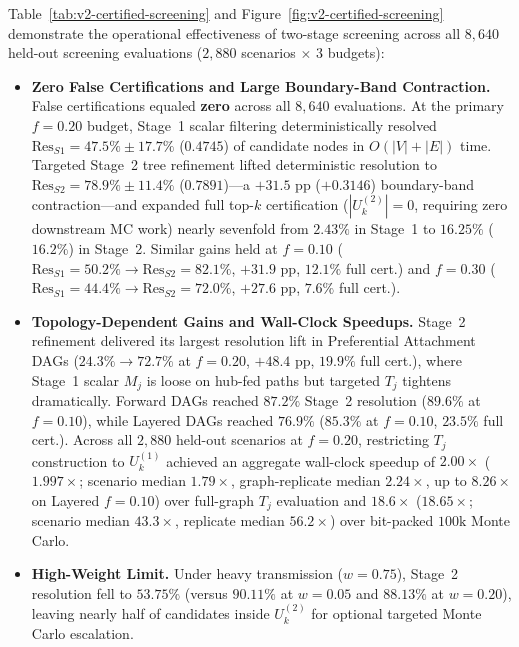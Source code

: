 Table~\ref{tab:v2-certified-screening} and
Figure~\ref{fig:v2-certified-screening} demonstrate the operational
effectiveness of two-stage screening across all $8,640$ held-out
screening evaluations ($2,880$ scenarios $\times$ $3$ budgets):
\begin{itemize}[leftmargin=*]
\item \textbf{Zero False Certifications and Large Boundary-Band
Contraction.} False certifications equaled \textbf{zero} across all
$8,640$ evaluations. At the primary $f=0.20$ budget, Stage~1 scalar
filtering deterministically resolved $\mathrm{Res}_{S1} = 47.5\% \pm 17.7\%$
($0.4745$) of candidate nodes in $O(|V|+|E|)$ time. Targeted Stage~2
tree refinement lifted deterministic resolution to
$\mathrm{Res}_{S2} = 78.9\% \pm 11.4\%$ ($0.7891$)---a $+31.5\text{ pp}$
($+0.3146$) boundary-band contraction---and expanded full top-$k$
certification ($|U_k^{(2)}| = 0$, requiring zero downstream MC work)
nearly sevenfold from $2.43\%$ in Stage~1 to $16.25\%$ ($16.2\%$) in
Stage~2. Similar gains held at $f=0.10$ ($\mathrm{Res}_{S1}=50.2\% \to
\mathrm{Res}_{S2}=82.1\%$, $+31.9\text{ pp}$, $12.1\%$ full cert.) and
$f=0.30$ ($\mathrm{Res}_{S1}=44.4\% \to \mathrm{Res}_{S2}=72.0\%$,
$+27.6\text{ pp}$, $7.6\%$ full cert.).
\item \textbf{Topology-Dependent Gains and Wall-Clock Speedups.}
Stage~2 refinement delivered its largest resolution lift in Preferential
Attachment DAGs ($24.3\% \to 72.7\%$ at $f=0.20$, $+48.4\text{ pp}$,
$19.9\%$ full cert.), where Stage~1 scalar $M_j$ is loose on hub-fed
paths but targeted $T_j$ tightens dramatically. Forward DAGs reached
$87.2\%$ Stage~2 resolution ($89.6\%$ at $f=0.10$), while Layered DAGs
reached $76.9\%$ ($85.3\%$ at $f=0.10$, $23.5\%$ full cert.). Across
all $2,880$ held-out scenarios at $f=0.20$, restricting $T_j$
construction to $U_k^{(1)}$ achieved an aggregate wall-clock speedup of
\textbf{$2.00\times$} ($1.997\times$; scenario median $1.79\times$,
graph-replicate median $2.24\times$, up to $8.26\times$ on Layered
$f=0.10$) over full-graph $T_j$ evaluation and \textbf{$18.6\times$}
($18.65\times$; scenario median $43.3\times$, replicate median
$56.2\times$) over bit-packed $100\text{k}$ Monte Carlo.
\item \textbf{High-Weight Limit.} Under heavy transmission ($w=0.75$),
Stage~2 resolution fell to $53.75\%$ (versus $90.11\%$ at $w=0.05$ and
$88.13\%$ at $w=0.20$), leaving nearly half of candidates inside
$U_k^{(2)}$ for optional targeted Monte Carlo escalation.
\end{itemize}

